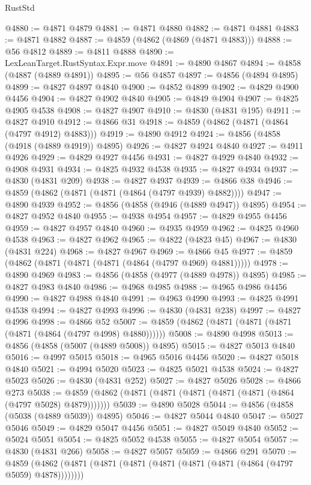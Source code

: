 \begin{lexlean}{RustStd}
\begin{coremodule}
@4880 := @4871 @4879
@4881 := @4871 @4880
@4882 := @4871 @4881
@4883 := @4871 @4882
@4887 := @4859 (@4862 (@4869 (@4871 @4883)))
@4888 := @56 @4812
@4889 := @4811 @4888
@4890 := LexLeanTarget.RustSyntax.Expr.move
@4891 := @4890 @4867
@4894 := @4858 (@4887 (@4889 @4891))
@4895 := @56 @4857
@4897 := @4856 (@4894 @4895)
@4899 := @4827 @4897 @4840
@4900 := @4852 @4899
@4902 := @4829 @4900 @4456
@4904 := @4827 @4902 @4840
@4905 := @4849 @4904
@4907 := @4825 @4905 @4538
@4908 := @4827 @4907
@4910 := @4830 (@4831 @195)
@4911 := @4827 @4910
@4912 := @4866 @31
@4918 := @4859 (@4862 (@4871 (@4864 (@4797 @4912) @4883)))
@4919 := @4890 @4912
@4924 := @4856 (@4858 (@4918 (@4889 @4919)) @4895)
@4926 := @4827 @4924 @4840
@4927 := @4911 @4926
@4929 := @4829 @4927 @4456
@4931 := @4827 @4929 @4840
@4932 := @4908 @4931
@4934 := @4825 @4932 @4538
@4935 := @4827 @4934
@4937 := @4830 (@4831 @209)
@4938 := @4827 @4937
@4939 := @4866 @38
@4946 := @4859 (@4862 (@4871 (@4871 (@4864 (@4797 @4939) @4882))))
@4947 := @4890 @4939
@4952 := @4856 (@4858 (@4946 (@4889 @4947)) @4895)
@4954 := @4827 @4952 @4840
@4955 := @4938 @4954
@4957 := @4829 @4955 @4456
@4959 := @4827 @4957 @4840
@4960 := @4935 @4959
@4962 := @4825 @4960 @4538
@4963 := @4827 @4962
@4965 := @4822 (@4823 @45)
@4967 := @4830 (@4831 @224)
@4968 := @4827 @4967
@4969 := @4866 @45
@4977 := @4859 (@4862 (@4871 (@4871 (@4871 (@4864 (@4797 @4969) @4881)))))
@4978 := @4890 @4969
@4983 := @4856 (@4858 (@4977 (@4889 @4978)) @4895)
@4985 := @4827 @4983 @4840
@4986 := @4968 @4985
@4988 := @4965 @4986 @4456
@4990 := @4827 @4988 @4840
@4991 := @4963 @4990
@4993 := @4825 @4991 @4538
@4994 := @4827 @4993
@4996 := @4830 (@4831 @238)
@4997 := @4827 @4996
@4998 := @4866 @52
@5007 := @4859 (@4862 (@4871 (@4871 (@4871 (@4871 (@4864 (@4797 @4998) @4880))))))
@5008 := @4890 @4998
@5013 := @4856 (@4858 (@5007 (@4889 @5008)) @4895)
@5015 := @4827 @5013 @4840
@5016 := @4997 @5015
@5018 := @4965 @5016 @4456
@5020 := @4827 @5018 @4840
@5021 := @4994 @5020
@5023 := @4825 @5021 @4538
@5024 := @4827 @5023
@5026 := @4830 (@4831 @252)
@5027 := @4827 @5026
@5028 := @4866 @273
@5038 := @4859 (@4862 (@4871 (@4871 (@4871 (@4871 (@4871 (@4864 (@4797 @5028) @4879)))))))
@5039 := @4890 @5028
@5044 := @4856 (@4858 (@5038 (@4889 @5039)) @4895)
@5046 := @4827 @5044 @4840
@5047 := @5027 @5046
@5049 := @4829 @5047 @4456
@5051 := @4827 @5049 @4840
@5052 := @5024 @5051
@5054 := @4825 @5052 @4538
@5055 := @4827 @5054
@5057 := @4830 (@4831 @266)
@5058 := @4827 @5057
@5059 := @4866 @291
@5070 := @4859 (@4862 (@4871 (@4871 (@4871 (@4871 (@4871 (@4871 (@4864 (@4797 @5059) @4878))))))))

\end{coremodule}
\end{lexlean}
